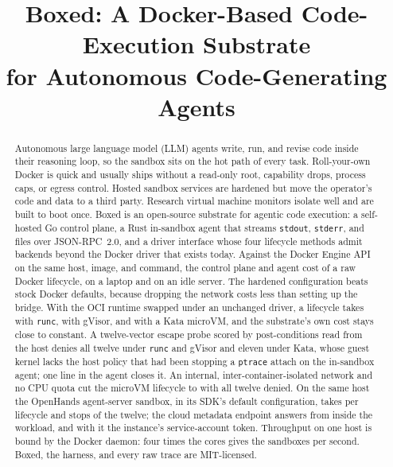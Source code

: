 \documentclass[conference]{IEEEtran}
\begin{document}
\title{Boxed: A Docker-Based Code-Execution Substrate\\for Autonomous
Code-Generating Agents}

\author{
}

\maketitle

\begin{abstract}
Autonomous large language model (LLM) agents write, run, and revise code
inside their reasoning loop, so the sandbox sits on the hot path of every
task. Roll-your-own Docker is quick and usually ships without a read-only
root, capability drops, process caps, or egress control. Hosted sandbox
services are hardened but move the operator's code and data to a third
party. Research virtual machine monitors isolate well and are built to boot
once. Boxed is an open-source substrate for agentic code execution: a
self-hosted Go control plane, a \BoxedAgentBinSize{} Rust in-sandbox agent
that streams \texttt{stdout}, \texttt{stderr}, and files over
JSON-RPC~2.0, and a driver interface whose four lifecycle methods admit
backends beyond the Docker driver that exists today. Against the Docker
Engine API on the same host, image, and command, the control plane and
agent cost \BoxedOverheadPct{} of a raw Docker lifecycle, on a laptop and
on an idle server. The hardened configuration beats stock Docker defaults,
because dropping the network costs less than setting up the bridge. With
the OCI runtime swapped under an unchanged driver, a lifecycle takes
\RuncBoxedMedian{} with \texttt{runc}, \RunscBoxedMedian{} with gVisor, and
\KataBoxedMedian{} with a Kata microVM, and the substrate's own cost stays
close to constant. A twelve-vector escape probe scored by post-conditions
read from the host denies all twelve under \texttt{runc} and gVisor and
eleven under Kata, whose guest kernel lacks the host policy that had been
stopping a \texttt{ptrace} attach on the in-sandbox agent; one line in the
agent closes it. An internal, inter-container-isolated network and no CPU
quota cut the microVM lifecycle to \KataAwareBoxedMedian{} with all twelve
denied. On the same host the OpenHands agent-server sandbox, in its SDK's
default configuration, takes \OHMedian{} per lifecycle and stops
\OHDenied{} of the twelve; the cloud metadata endpoint answers from inside
the workload, and with it the instance's service-account token. Throughput
on one host is bound by the Docker daemon: four times the cores gives
\ScaleRatioMax{} the sandboxes per second. Boxed, the harness, and every
raw trace are MIT-licensed.
\end{abstract}
\end{document}
